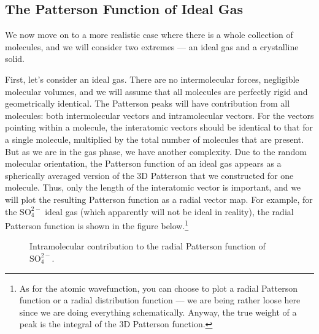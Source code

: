 \documentclass{article}
\theoremstyle{plain}\theoremheaderfont{\normalfont\itshape}\theorembodyfont{\rmfamily}\theoremseparator{.}\newtheorem*{rem}{Remark}\newtheorem*{ex}{Example}\newtheorem*{proof}{Proof}\newtheorem*{altp}{Alternative proof}
\theoremstyle{plain}\theoremheaderfont{\normalfont\bfseries}\theorembodyfont{\rmfamily}\theoremseparator{.}\newtheorem{thm}{Theorem}[section]\newtheorem{lem}[thm]{Lemma}\newtheorem{prop}[thm]{Proposition}\newtheorem*{cor}{Corollary}\newtheorem{defn}[thm]{Definition}\newtheorem{clm}[thm]{Claim}\newtheorem{clminproof}{Claim}\newtheorem*{law}{Law}\newtheorem{pos}[thm]{Postulate}
\theoremstyle{break}\theoremheaderfont{\normalfont\itshape}\theorembodyfont{\rmfamily}\theoremseparator{.\medskip}\newtheorem*{proofskip}{Proof}\newtheorem*{exs}{Examples}\newtheorem*{rems}{Remarks}
\theoremstyle{break}\theoremheaderfont{\normalfont\bfseries}\theorembodyfont{\rmfamily}\theoremseparator{.\medskip}\newtheorem{lemskip}[thm]{Lemma}\newtheorem{defnskip}[thm]{Definition}\newtheorem{propskip}[thm]{Proposition}\newtheorem{thmskip}[thm]{Theorem}
\numberwithin{equation}{section}
\begin{document}
    \subsection{The Patterson Function of Ideal Gas}
    We now move on to a more realistic case where there is a whole collection of molecules, and we will consider two extremes --- an ideal gas and a crystalline solid.

    First, let's consider an ideal gas. There are no intermolecular forces, negligible molecular volumes, and we will assume that all molecules are perfectly rigid and geometrically identical. The Patterson peaks will have contribution from all molecules: both intermolecular vectors and intramolecular vectors. For the vectors pointing within a molecule, the interatomic vectors should be identical to that for a single molecule, multiplied by the total number of molecules that are present. But as we are in the gas phase, we have another complexity. Due to the random molecular orientation, the Patterson function of an ideal gas appears as a spherically averaged version of the 3D Patterson that we constructed for one molecule. Thus, only the length of the interatomic vector is important, and we will plot the resulting Patterson function as a radial vector map. For example, for the \(\mathrm{SO_4^{2-}}\) ideal gas (which apparently will not be ideal in reality), the radial Patterson function is shown in the figure below.\footnote{As for the atomic wavefunction, you can choose to plot a radial Patterson function or a radial distribution function --- we are being rather loose here since we are doing everything schematically. Anyway, the true weight of a peak is the integral of the 3D Patterson function.}
    \begin{figure}[ht!]
        \centering
        \caption{Intramolecular contribution to the radial Patterson function of \(\mathrm{SO_4^{2-}}\).}
    \end{figure}
\end{document}
